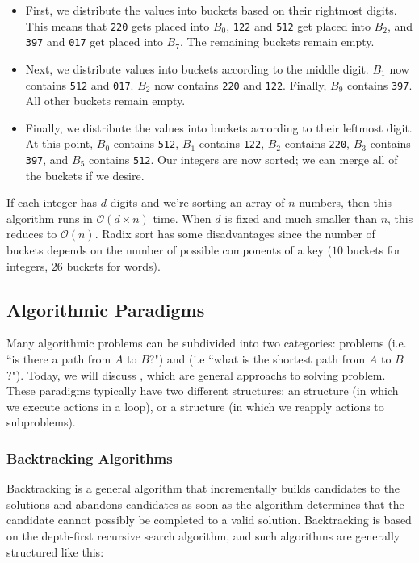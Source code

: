  \begin{itemize}
     \item First, we distribute the values into buckets based on their rightmost digits. This means that \verb!220! gets placed into $B_0$, \verb!122! and \verb!512! get placed into $B_2$, and \verb!397! and \verb!017! get placed into $B_7$. The remaining buckets remain empty.
     \item Next, we distribute values into buckets according to the middle digit. $B_1$ now contains \verb!512! and \verb!017!. $B_2$ now contains \verb!220! and \verb!122!. Finally, $B_9$ contains \verb!397!. All other buckets remain empty.
     \item Finally, we distribute the values into buckets according to their leftmost digit. At this point, $B_0$ contains \verb!512!, $B_1$ contains \verb!122!, $B_2$ contains \verb!220!, $B_3$ contains \verb!397!, and $B_5$ contains \verb!512!. Our integers are now sorted; we can merge all of the buckets if we desire.
 \end{itemize}
 
 If each integer has $d$ digits and we're sorting an array of $n$ numbers, then this algorithm runs in $\mathcal{O}(d \times n)$ time. When $d$ is fixed and much smaller than $n$, this reduces to $\mathcal{O}(n)$. Radix sort has some disadvantages since the number of buckets depends on the number of possible components of a key ($10$ buckets for integers, $26$ buckets for words).
 
 \subsection{Algorithmic Paradigms}
 
Many algorithmic problems can be subdivided into two categories:  problems (i.e. ``is there a path from $A$ to $B$?") and  (i.e ``what is the shortest path from $A$ to $B$?"). Today, we will discuss , which are general approachs to solving problem. These paradigms typically have two different structures: an  structure (in which we execute actions in a loop), or a  structure (in which we reapply actions to subproblems). 

\subsubsection{Backtracking Algorithms}

Backtracking is a general algorithm that incrementally builds candidates to the solutions and abandons candidates as soon as the algorithm determines that the candidate cannot possibly be completed to a valid solution. Backtracking is based on the depth-first recursive search algorithm, and such algorithms are generally structured like this:

